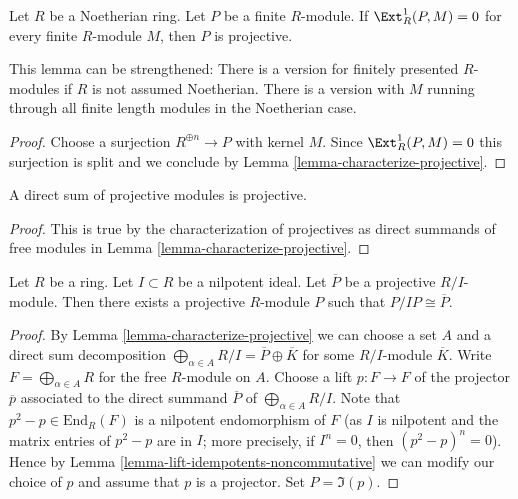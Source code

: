 \begin{lemma}
\label{lemma-characterize-finite-projective-noetherian}
Let $R$ be a Noetherian ring. Let $P$ be a finite $R$-module.
If $\Ext^1_R(P, M) = 0$ for every finite $R$-module $M$, then
$P$ is projective.
\end{lemma}

\noindent
This lemma can be strengthened: There is a version for finitely presented
$R$-modules if $R$ is not assumed Noetherian. There is a version with $M$
running through all finite length modules in the Noetherian case.

\begin{proof}
Choose a surjection $R^{\oplus n} \to P$ with kernel $M$.
Since $\Ext^1_R(P, M) = 0$ this surjection is split and
we conclude by Lemma \ref{lemma-characterize-projective}.
\end{proof}

\begin{lemma}
\label{lemma-direct-sum-projective}
A direct sum of projective modules is projective.
\end{lemma}

\begin{proof}
This is true by the characterization of projectives as direct
summands of free modules in
Lemma \ref{lemma-characterize-projective}.
\end{proof}

\begin{lemma}
\label{lemma-lift-projective-module}
Let $R$ be a ring. Let $I \subset R$ be a nilpotent ideal. Let
$\overline{P}$ be a projective $R/I$-module. Then there exists a
projective $R$-module $P$ such that $P/IP \cong \overline{P}$.
\end{lemma}

\begin{proof}
By Lemma \ref{lemma-characterize-projective}
we can choose a set $A$ and a direct sum decomposition
$\bigoplus_{\alpha \in A} R/I = \overline{P} \oplus \overline{K}$
for some $R/I$-module $\overline{K}$. Write $F = \bigoplus_{\alpha \in A} R$
for the free $R$-module on $A$. Choose a lift
$p : F \to F$ of the projector $\overline{p}$ associated to
the direct summand $\overline{P}$ of $\bigoplus_{\alpha \in A} R/I$.
Note that $p^2 - p \in \text{End}_R(F)$ is a nilpotent
endomorphism of $F$ (as $I$ is nilpotent and the matrix entries of
$p^2 - p$ are in $I$; more precisely, if $I^n = 0$, then $(p^2 - p)^n = 0$).
Hence by Lemma \ref{lemma-lift-idempotents-noncommutative}
we can modify our choice of $p$ and assume that $p$ is a projector.
Set $P = \Im(p)$.
\end{proof}

